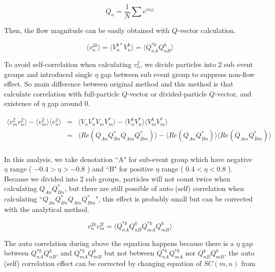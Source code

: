 \begin{equation}
	 Q_n = \frac{1}{N} \sum{e^{in\varphi}  } 
\end{equation}

Then, the flow magnitude can be easily obtained with $Q$-vector calculation. 

\begin{equation}
	\langle v_n^{2k} \rangle  = \langle V_n^{k*} V_n^k\rangle= \langle Q_{nA}^{*k} Q_{nB}^k \rangle
\end{equation}

To avoid self-correlation when calculating $v_n^2$, we divide particles into 2 sub event groups and introduced single $\eta$ gap between sub event group to suppress non-flow effect. So main difference between original method and this method is that calculate correlation with full-particle $Q$-vector or divided-particle $Q$-vector, and existence of $\eta$ gap around 0. 

\begin{eqnarray}
\langle v_m^2 v_n^2 \rangle - \langle v_m^2 \rangle \langle v_n^2 \rangle 
 &=& \langle V_n V_n^{*} V_m V_m^{*}\rangle - \langle V_n^k V_n^{*} \rangle \langle V_m^k V_m^{*}\rangle \\ 
 &=& \langle {Re( Q_{An} Q_{Bn}^* Q_{Am} Q_{Bm}^*)} \rangle - \langle {Re( Q_{An}Q_{Bn}^*) } \rangle  \langle { Re(Q_{Am} Q_{Bm}^*) }\rangle \nonumber \\  
\end{eqnarray}


In this analysis, we take denotation ``A" for sub-event group which have negative $\eta$ range ( $-0.4 > \eta > -0.8$ ) and ``B" for positive $\eta$ range ( $0.4 < \eta < 0.8$ ). Because we divided into 2 sub groups, particles will not count twice when calculating $Q_{An} Q_{Bn}^*$, but there are still possible of auto (self) correlation when calculating ``$Q_{An} Q_{Bn}^* Q_{Am} Q_{Bm}^*$", this effect is probably small but can be corrected with the analytical method. 

\begin{equation}
	v_n^{2k}v_m^{2l} = \langle  Q_{nA}^{*k} Q_{nB}^k Q_{mA}^{*k} Q_{mB}^k \rangle
\end{equation}

The auto correlation during above the equation happens because there is a $\eta$ gap between $Q_{nA}^{*k} Q_{nB}^k$, and $Q_{mA}^{*k} Q_{mB}^k$ but not between $Q_{nA}^{*k}Q_{mA}^{*k}$ nor $Q_{nB}^k Q_{mB}^k$,  the auto (self) correlation effect can be corrected by changing equation of $SC(m,n)$ from

